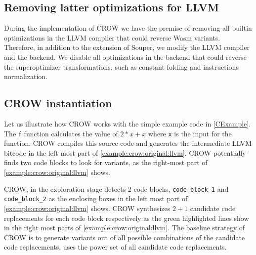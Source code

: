 \subsection*{Removing latter optimizations for LLVM}

During the implementation of CROW we have the premise of removing all builtin optimizations in the LLVM compiler that could reverse Wasm variants.
Therefore, in addition to the extension of Souper, we modify the LLVM compiler and the \wasm backend.
We disable all optimizations in the \wasm backend that could reverse the superoptimizer transformations, such as constant folding and instructions normalization.



\subsection*{CROW instantiation}

Let us illustrate how CROW works with the simple example code in \autoref{CExample}. The \texttt{f} function calculates the value of $2 * x + x$ where \texttt{x} is the input for the function.  CROW compiles this source code and generates the intermediate LLVM bitcode in the left most part of \autoref{example:crow:original:llvm}. CROW potentially finds two code blocks to look for variants, as the right-most part of \autoref{example:crow:original:llvm} shows.


    

CROW, in the exploration stage detects 2 code blocks, \texttt{code\_block\_1} and \texttt{code\_block\_2} as the enclosing boxes in the left most part of \autoref{example:crow:original:llvm} shows. CROW synthesizes $2 + 1$ candidate code replacements for each code block respectively as the green highlighted lines show in the right most parts of \autoref{example:crow:original:llvm}.
The baseline strategy of CROW is to generate variants out of all possible combinations of the candidate code replacements, \ie uses the power set of all candidate code replacements.

